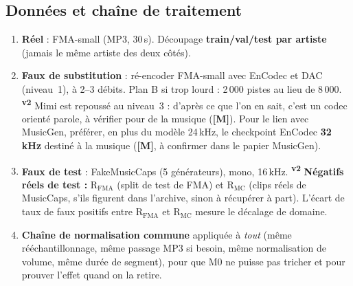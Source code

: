 \documentclass[11pt,a4paper]{article}
\providecommand{\og}{\guillemotleft\nobreakspace}%
\providecommand{\fg}{\nobreakspace\guillemotright}}
\newcommand{\vtwo}{\textsuperscript{\textcolor{orange!80!black}{\textbf{v2}}}}
\newcommand{\lM}{\textbf{\textcolor{red!70!black}{[M]}}}
\begin{document}
\subsection{Données et chaîne de traitement}\label{sec:donnees}
\begin{enumerate}
\item \textbf{Réel} : FMA-small (MP3, 30\,s). Découpage \textbf{train/val/test par artiste} (jamais le même artiste des deux côtés).
\item \textbf{Faux de substitution} : ré-encoder FMA-small avec EnCodec et DAC (niveau~1), à 2--3 débits. Plan B si trop lourd : 2\,000 pistes au lieu de 8\,000. \vtwo{} Mimi est repoussé au niveau~3 : d'après ce que l'on en sait, c'est un codec orienté parole, à vérifier pour de la musique (\lM). Pour le lien avec MusicGen, préférer, en plus du modèle 24\,kHz, le checkpoint EnCodec \textbf{32\,kHz} destiné à la musique (\lM, à confirmer dans le papier MusicGen).
\item \textbf{Faux de test} : FakeMusicCaps (5 générateurs), mono, 16\,kHz. \vtwo{} \textbf{Négatifs réels de test :} R$_{\text{FMA}}$ (split de test de FMA) et R$_{\text{MC}}$ (clips réels de MusicCaps, s'ils figurent dans l'archive, sinon à récupérer à part). L'écart de taux de faux positifs entre R$_{\text{FMA}}$ et R$_{\text{MC}}$ mesure le décalage de domaine.
\item \textbf{Chaîne de normalisation commune} appliquée à \emph{tout} (même rééchantillonnage, même passage MP3 si besoin, même normalisation de volume, même durée de segment), pour que M0 ne puisse pas \og{}tricher\fg{} et pour prouver l'effet quand on la retire.
\end{enumerate}
\end{document}
